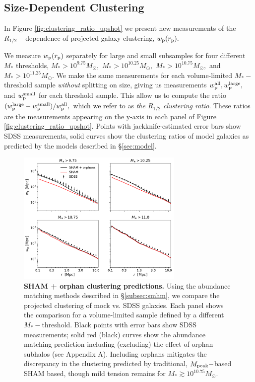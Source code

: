 \documentclass[usenatbib,usegraphicx,letterpaper]{mn2e}
\newcommand{\rhalf}{R_{1/2}}
\newcommand{\mstar}{M_{\ast}}
\newcommand{\mpeak}{M_{\rm peak}}
\newcommand{\rproj}{r_{\rm p}}
\newcommand{\wproj}{w_{\rm p}}
\newcommand{\wplarge}{w_{\rm p}^{\rm large}}
\newcommand{\wpsmall}{w_{\rm p}^{\rm small}}
\newcommand{\wpall}{w_{\rm p}^{\rm all}}
\newcommand{\msun}{M_\odot}
\begin{document}
\subsection{Size-Dependent Clustering}
\label{subsec:clustering_results}

In Figure \ref{fig:clustering_ratio_upshot} we present new measurements of the $\rhalf-$dependence of projected galaxy clustering, $\wproj(\rproj).$ 

We measure $\wproj(\rproj)$ separately for large and small subsamples for four different $\mstar$ thresholds, $\mstar>10^{9.75}\msun,$ $\mstar>10^{10.25}\msun,$ $\mstar>10^{10.75}\msun,$ and $\mstar>10^{11.25}\msun.$ We make the same measurements for each volume-limited $\mstar-$threshold sample {\em without} splitting on size, giving us measurements $\wpall, \wplarge,$ and $\wpsmall$ for each threshold sample. This allow us to compute the ratio $(\wplarge-\wpsmall)/\wpall,$ which we refer to as {\em the $\rhalf$ clustering ratio}. These ratios are the measurements appearing on the y-axis in each panel of Figure \ref{fig:clustering_ratio_upshot}. Points with jackknife-estimated error bars show SDSS measurements, solid curves show the clustering ratios of model galaxies as predicted by the models described in \S\ref{sec:model}.

\begin{figure}
\centering
\includegraphics[width=8cm]{FIGS/baseline_sham_orphans.pdf}
\caption{
{\bf SHAM + orphan clustering predictions.}
Using the abundance matching methods described in \S\ref{subsec:smhm}, we compare the projected clustering of mock vs. SDSS galaxies. Each panel shows the comparison for a volume-limited sample defined by a different $\mstar-$threshold. Black points with error bars show SDSS measurements; solid red (black) curves show the abundance matching prediction including (excluding) the effect of orphan subhalos (see Appendix A). Including orphans mitigates the discrepancy in the clustering predicted by traditional, $\mpeak-$based SHAM based, though mild tension remains for $\mstar\gtrsim10^{10.75}\msun.$
}
\label{fig:baseline_sham_clustering}
\end{figure}
\end{document}
